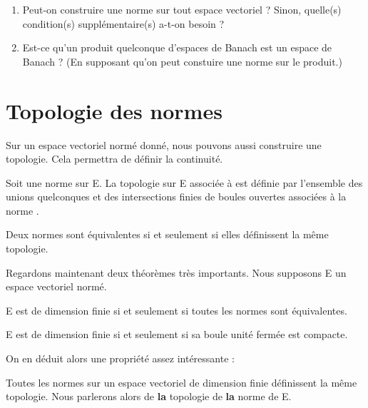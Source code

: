 \begin{question}
	\begin{enumerate}
		\item Peut-on construire une norme sur tout espace vectoriel ?
			Sinon, quelle(s) condition(s) supplémentaire(s) a-t-on besoin ?
		\item Est-ce qu'un produit quelconque d'espaces de Banach est un
			espace de Banach ? (En supposant qu'on peut constuire une norme
			sur le produit.)
	\end{enumerate}
\end{question}

\section{Topologie des normes}

Sur un espace vectoriel normé donné, nous pouvons aussi construire une
topologie. Cela permettra de définir la continuité.

\begin{definition}
	Soit une norme  sur E. La topologie sur E associée à 
	est définie par l'ensemble des unions quelconques et des intersections
	finies de boules ouvertes associées à la norme .
\end{definition}

\begin{proposition}
	Deux normes sont équivalentes si et seulement si elles définissent la même topologie.
\end{proposition}

Regardons maintenant deux théorèmes très importants. Nous supposons E un espace
vectoriel normé.

\begin{theorem}
	E est de dimension finie si et seulement si toutes les normes sont équivalentes.
\end{theorem}

\begin{theorem}
	\label{Riesz}
	E est de dimension finie si et seulement si sa boule unité fermée est compacte.
\end{theorem}

On en déduit alors une propriété assez intéressante :

\begin{proposition}
	Toutes les normes sur un espace vectoriel de dimension finie définissent la
	même topologie. Nous parlerons alors de \textbf{la} topologie de \textbf{la} norme de E.
\end{proposition}

